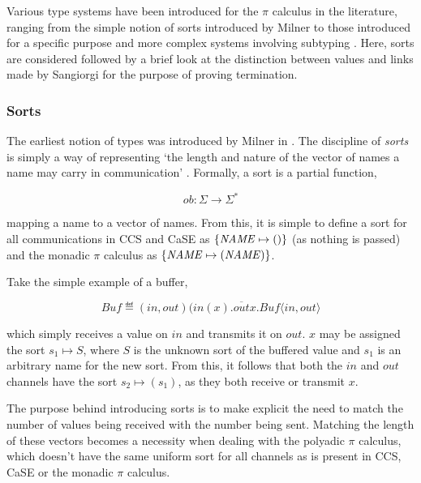 Various type systems have been introduced for the $\pi$ calculus in
the literature, ranging from the simple notion of sorts introduced by
Milner \cite{milner:pi} to those introduced for a specific purpose
\cite{sangiorgi:types-or} and more complex systems involving subtyping
\cite{sangiorgi:typing}.  Here, sorts are considered followed by a
brief look at the distinction between values and links made by
Sangiorgi \cite{sangiorgi:types-or} for the purpose of proving
termination.

\subsubsection{Sorts}
\label{sorts}

The earliest notion of types was introduced by Milner in
\cite{milner:93polyadic, milner:pi}.  The discipline of \emph{sorts}
is simply a way of representing `the length and nature of the vector
of names a name may carry in communication' \cite{milner:93polyadic}.
Formally, a sort is a partial function,

\begin{equation}
ob : \Sigma \rightarrow \Sigma^*
\end{equation}

\noindent mapping a name to a vector of names.  From this, it is
simple to define a sort for all communications in CCS and CaSE as
$\{\mathit{NAME} \mapsto ()\}$ (as nothing is passed) and the monadic $\pi$
calculus as $\{\mathit{NAME} \mapsto (\mathit{NAME})\}$.

Take the simple example of a buffer,

\begin{equation}
  Buf \eqdef (in,out)(in(x).\overline{out}x.Buf\langle in,
  out\rangle 
\end{equation}

\noindent which simply receives a value on $in$ and transmits it on
$out$.  $x$ may be assigned the sort $s_1 \mapsto S$, where $S$ is the
unknown sort of the buffered value and $s_1$ is an arbitrary name for
the new sort.  From this, it follows that both the $in$ and $out$
channels have the sort $s_2 \mapsto (s_1)$, as they both receive or
transmit $x$.

The purpose behind introducing sorts is to make explicit the need to
match the number of values being received with the number being sent.
Matching the length of these vectors becomes a necessity when dealing
with the polyadic $\pi$ calculus, which doesn't have the same uniform
sort for all channels as is present in CCS, CaSE or the monadic $\pi$
calculus.


